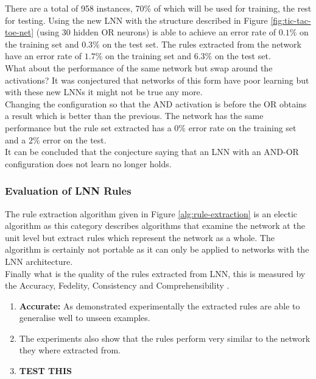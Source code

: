 There are a total of 958 instances, 70\% of which will be used for training, the rest for testing. Using the new LNN with the structure described in Figure \ref{fig:tic-tac-toe-net} (using 30 hidden OR neurons) is able to achieve an error rate of $0.1\%$ on the training set and $0.3\%$ on the test set. The rules extracted from the network have an error rate of $1.7\%$ on the training set and $6.3\%$ on the test set.\\

What about the performance of the same network but swap around the activations? It was conjectured that networks of this form have poor learning \cite{LearningLogicalActivations} but with these new LNNs it might not be true any more.\\

Changing the configuration so that the AND activation is before the OR obtains a result which is better than the previous. The network has the same performance but the rule set extracted has a $0\%$ error rate on the training set and a $2\%$ error on the test.\\

It can be concluded that the conjecture saying that an LNN with an AND-OR configuration does not learn no longer holds.

\subsubsection{Evaluation of LNN Rules}


The rule extraction algorithm given in Figure \ref{alg:rule-extraction} is an electic algorithm as this category describes algorithms that examine the network at the unit level but extract rules which represent the network as a whole. The algorithm is certainly not portable as it can only be applied to networks with the LNN architecture.\\

Finally what is the quality of the rules extracted from LNN, this is measured by the Accuracy, Fedelity, Consistency and Comprehensibility \cite{andrews1995survey}.

\begin{enumerate}
	\item \textbf{Accurate:} As demonstrated experimentally the extracted rules are able to generalise well to unseen examples.
	\item {} The experiments also show that the rules perform very similar to the network they where extracted from.
	\item {} \textbf{TEST THIS}
\end{enumerate}

